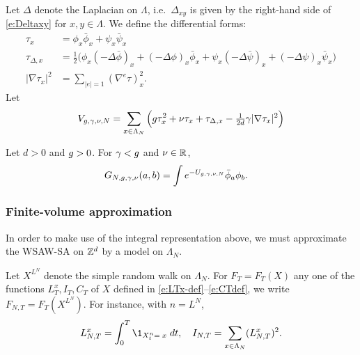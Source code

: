 Let $\Delta$ denote the Laplacian on $\Lambda$,
i.e.\ $\Delta_{xy}$ is given by the right-hand side of
\eqref{e:Deltaxy} for $x, y \in \Lambda$.
We define the differential forms:
\begin{align}
\label{e:taudef}
\tau_x
	&=
\phi_x \bar\phi_x + \psi_x \bar\psi_x
	\\
\label{e:addDelta}
\tau_{\Delta,x}
	&=
\frac 12
\Big(
	\phi_{x} (- \Delta \bar{\phi})_{x} + (- \Delta \phi)_{x} \bar{\phi}_{x}
		+
	\psi_{x}  (- \Delta \bar{\psi})_{x} + (- \Delta \psi)_{x}  \bar{\psi}_{x}
\Big)
	\\
\label{e:nablatau}
|\nabla \tau_x|^2
	&=
\sum_{|e|=1} (\nabla^e \tau)_x^2.
\end{align}
Let
\begin{equation}
\label{e:Vdef2}
V_{g,\gamma,\nu,N}
	=
\sum_{x\in\Lambda_N}
\Big(
	g \tau_x^2 + \nu \tau_x + \tau_{\Delta,x} - \tfrac{1}{2 d} \gamma |\nabla \tau_x|^2
\Big)
\end{equation}

\begin{prop}
Let $d > 0$ and $g > 0$. For $\gamma < g$ and $\nu \in {\mathbb R}$,
\begin{align}
\label{e:Grep-pos-bis}
G_{N,g,\gamma,\nu}(a, b)
	&=
\int e^{-U_{g,\gamma,\nu,N}} \bar\phi_a \phi_b.
\end{align}
\end{prop}

\subsubsection{Finite-volume approximation}

In order to make use of the integral representation above, we must approximate the
WSAW-SA on ${ {{\mathbb Z}}^d }$ by a model on $\Lambda_N$.

Let $X^{L^N}$ denote the simple random walk on $\Lambda_N$.
For $F_T = F_T(X)$ any one of the functions $L_T^x,I_T,C_T$
of $X$ defined in \eqref{e:LTx-def}--\eqref{e:CTdef},
we write $F_{N,T} = F_T(X^{L^N})$. For instance, with $n=L^N$,
\begin{equation}
    L^x_{N,T} = \int_0^T \1_{X^{n}_t=\;x} \; dt,
    \quad I_{N,T} = \sum_{x \in \Lambda_N}(L_{N,T}^x)^2 .
\end{equation}


